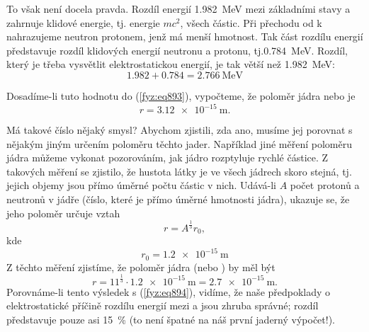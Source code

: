     To však není docela pravda. Rozdíl energií \SI{1.982}{\mega\electronvolt} mezi základními stavy
     a  zahrnuje klidové energie, tj. energie \(mc^2\), všech částic. Při
    přechodu od  k  nahrazujeme neutron protonem, jenž má menší hmotnost. Tak část
    rozdílu energií představuje rozdíl klidových energií neutronu a protonu,
    tj.\SI{0.784}{\mega\electronvolt}. Rozdíl, který je třeba vysvětlit elektrostatickou energií, je
    tak větší než \SI{1.982}{\mega\electronvolt}:
    \begin{equation*}
      \num{1.982} + \num{0.784} = \SI{2.766}{\mega\electronvolt}
    \end{equation*}

    Dosadíme-li tuto hodnotu do (\ref{fyz:eq893}), vypočteme, že poloměr jádra  nebo
     je
    \begin{equation}\label{fyz:eq894}
      r = \SI{3.12e-15}{\m}.
    \end{equation}

    Má takové číslo nějaký smysl? Abychom zjistili, zda ano, musíme jej porovnat s nějakým jiným
    určením poloměru těchto jader. Například jiné měření poloměru jádra můžeme vykonat pozorováním,
    jak jádro rozptyluje rychlé částice. Z takových měření se zjistilo, že hustota látky je ve všech
    jádrech skoro stejná, tj. jejich objemy jsou přímo úměrné počtu částic v nich. Udává-li \(A\)
    počet protonů a neutronů v jádře (číslo, které je přímo úměrné hmotnosti jádra), ukazuje se, že
    jeho poloměr určuje vztah
    \begin{equation}\label{fyz:eq895}
      r=A^{\frac{1}{3}}r_0,
    \end{equation}
    kde
    \begin{equation}\label{fyz:eq896}
      r_0=\SI{1.2e-15}{\m}
    \end{equation}
    Z těchto měření zjistíme, že poloměr jádra  (nebo ) by měl být
    \begin{equation*}
      r=11^\frac{1}{3}\cdot\SI{1.2e-15}{\m} = \SI{2.7e-15}{\m}.
    \end{equation*}
    Porovnáme-li tento výsledek s (\ref{fyz:eq894}), vidíme, že naše předpoklady o elektrostatické
    příčině rozdílu energií mezi  a  jsou zhruba správné; rozdíl představuje pouze
    asi \SI{15}{\percent} (to není špatné na náš první jaderný výpočet!).

